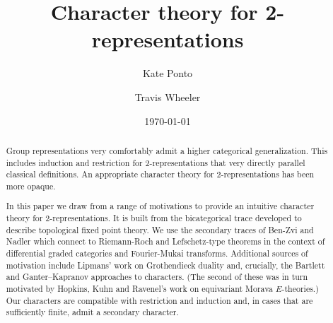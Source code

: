 \documentclass[11pt,oneside, %
]{amsart}
\title{Character theory for 2-representations}
\author{Kate Ponto}
\author{Travis Wheeler}
\date{\today}
\begin{document}
\maketitle
\begin{abstract}
Group representations very comfortably admit a higher categorical generalization.  This includes induction and restriction for 2-representations that very directly parallel classical definitions.  An appropriate character theory for 2-representations has been more opaque. 

In this paper we draw from a range of motivations to provide an intuitive character theory for 2-representations.  It is built from the bicategorical trace developed to describe topological fixed point theory.  We use the secondary traces of Ben-Zvi and  Nadler which connect to  Riemann-Roch and Lefschetz-type theorems in the context of differential graded categories and Fourier-Mukai transforms.  Additional sources of motivation include  Lipmans' work on Grothendieck duality and, crucially, the Bartlett and Ganter--Kapranov approaches to characters.  (The second of these was in turn motivated by Hopkins, Kuhn and Ravenel's work on equivariant
Morava $E$-theories.)
Our characters are compatible with restriction and induction and, in cases that are sufficiently finite, admit a secondary character.  

\end{abstract}
\setcounter{tocdepth}{1}
\makeatletter
\def\l@subsection{\@tocline{2}{0pt}{2.5pc}{5pc}{}}
\makeatother

\tableofcontents







  
\end{document}
